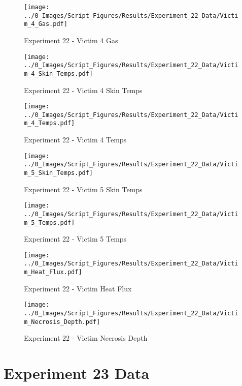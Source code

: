 	\clearpage

	\begin{figure}[H]
		\centering
		\texttt{[image: ../0\_Images/Script\_Figures/Results/Experiment\_22\_Data/Victim\_4\_Gas.pdf]}
		\caption[]{Experiment 22 - Victim 4 Gas}
	\end{figure}
 

	\begin{figure}[H]
		\centering
		\texttt{[image: ../0\_Images/Script\_Figures/Results/Experiment\_22\_Data/Victim\_4\_Skin\_Temps.pdf]}
		\caption[]{Experiment 22 - Victim 4 Skin Temps}
	\end{figure}
 
	\clearpage

	\begin{figure}[H]
		\centering
		\texttt{[image: ../0\_Images/Script\_Figures/Results/Experiment\_22\_Data/Victim\_4\_Temps.pdf]}
		\caption[]{Experiment 22 - Victim 4 Temps}
	\end{figure}
 

	\begin{figure}[H]
		\centering
		\texttt{[image: ../0\_Images/Script\_Figures/Results/Experiment\_22\_Data/Victim\_5\_Skin\_Temps.pdf]}
		\caption[]{Experiment 22 - Victim 5 Skin Temps}
	\end{figure}
 
	\clearpage

	\begin{figure}[H]
		\centering
		\texttt{[image: ../0\_Images/Script\_Figures/Results/Experiment\_22\_Data/Victim\_5\_Temps.pdf]}
		\caption[]{Experiment 22 - Victim 5 Temps}
	\end{figure}
 

	\begin{figure}[H]
		\centering
		\texttt{[image: ../0\_Images/Script\_Figures/Results/Experiment\_22\_Data/Victim\_Heat\_Flux.pdf]}
		\caption[]{Experiment 22 - Victim Heat Flux}
	\end{figure}
 
	\clearpage

	\begin{figure}[H]
		\centering
		\texttt{[image: ../0\_Images/Script\_Figures/Results/Experiment\_22\_Data/Victim\_Necrosis\_Depth.pdf]}
		\caption[]{Experiment 22 - Victim Necrosis Depth}
	\end{figure}
 

\clearpage		\large
\section{Experiment 23 Data} \label{App:Exp23Results} 

